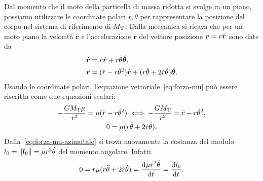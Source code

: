 Dal momento che il moto della particella di massa ridotta si svolge in un piano,
possiamo utilizzare le coordinate polari $r,\theta$ per rappresentare la
posizione del corpo nel sistema di riferimento di $M_\textup{T}$. Dalla
meccanica si ricava che per un moto piano la velocità $\dot{\bm{r}}$ e
l'accelerazione $\ddot{\bm{r}}$ del vettore posizione $\bm{r}=r\hat{\bm{r}}$ sono
date da
\begin{subequations}
  \begin{align}
    \dot{\bm{r}}  &= \dot{r}\hat{\bm{r}} +
    r\dot{\theta}\hat{\bm{\theta}}, \label{eq:velocita-polare}\\
    \ddot{\bm{r}} &= (\ddot{r}-r\dot{\theta}^2)\hat{\bm{r}} + (r\ddot{\theta} +
    2\dot{r}\dot{\theta}) \hat{\bm{\theta}}.
  \end{align}
\end{subequations}
Usando le coordinate polari, l'equazione vettoriale~\eqref{eq:forza-mu} può
essere riscritta come due equazioni scalari:
\begin{subequations}
  \begin{gather}
    -\frac{GM_\textup{T}\mu}{r^2} = \mu(\ddot{r} - r\dot{\theta}^2) \iff
    -\frac{GM_\textup{T}}{r^2}=\ddot{r}-r\dot{\theta}^2,
    \label{eq:forza-mu-radiale}\\
    0 = \mu(r\ddot{\theta} +
    2\dot{r}\dot{\theta}). \label{eq:forza-mu-azimutale}
  \end{gather}
\end{subequations}
Dalla~\eqref{eq:forza-mu-azimutale} si trova nuovamente la costanza del modulo
$l_0 = \lVert\bm{l}_0\rVert = \mu r^2\dot{\theta}$ del momento angolare. Infatti
\begin{equation}
  0 = r\mu(r\ddot{\theta} + 2\dot{r}\dot{\theta}) = \frac{{\mathop{}\!\mathrm{d}^{}}\mu
    r^2\dot{\theta}}{\mathop{}\!\mathrm{d} {t}^{}} = \frac{{\mathop{}\!\mathrm{d}^{}}l_0}{\mathop{}\!\mathrm{d} {t}^{}}.
\end{equation}

